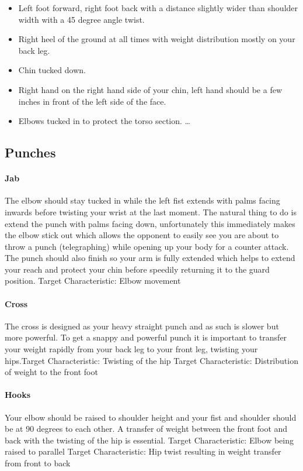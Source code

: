 \begin{itemize}
  \item Left foot forward, right foot back with a distance slightly wider than shoulder width with a 45 degree angle twist.
  \item Right heel of the ground at all times with weight distribution mostly on your back leg.
  \item Chin tucked down.
  \item Right hand on the right hand side of your chin, left hand should be a few inches in front of the left side of the face.
  \item Elbows tucked in to protect the torso section.
  \ldots
\end{itemize}

\subsection{Punches}
\label{subsec:subsec03}
\paragraph{Jab}
The elbow should stay tucked in while the left fist extends with palms facing inwards before twisting your wrist at the last moment. The natural thing to do is extend the punch with palms facing down, unfortunately this immediately makes the elbow stick out which allows the opponent to easily see you are about to throw a punch (telegraphing) while opening up your body for a counter attack. The punch should also finish so your arm is fully extended which helps to extend your reach and protect your chin before speedily returning it to the guard position.\newline
Target Characteristic: Elbow movement

\paragraph{Cross}
The cross is designed as your heavy straight punch and as such is slower but more powerful. To get a snappy and powerful punch it is important to transfer your weight rapidly from your back leg to your front leg, twisting your hips.\newline Target Characteristic: Twisting of the hip\newline
Target Characteristic: Distribution of weight to the front foot


\paragraph{Hooks}
Your elbow should be raised to shoulder height and your fist and shoulder should be at 90 degrees to each other. A transfer of weight between the front foot and back with the twisting of the hip is essential.\newline
Target Characteristic: Elbow being raised to parallel\newline
Target Characteristic: Hip twist resulting in weight transfer from front to back\newline

